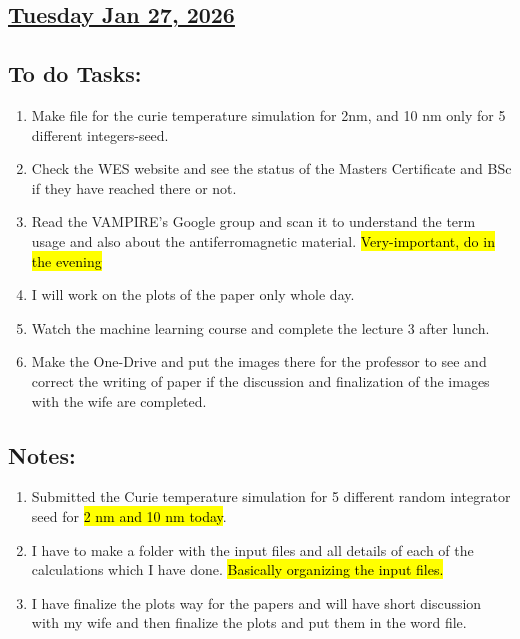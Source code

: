 \subsection*{\underline{Tuesday Jan 27, 2026}}
\subsection*{To do Tasks:}
\begin{enumerate}
     \item Make file for the curie temperature simulation for 2nm, and 10 nm only for 5 different integers-seed. \cmark
     \item Check the WES website and see the status of the Masters Certificate and BSc if they have reached there or not. \cmark
     \item Read the VAMPIRE's Google group and scan it to understand the  term usage and also about the antiferromagnetic material. \hl{Very-important, do in the evening}
     \item I will work on the plots of the paper only whole day. \cmark
     \item Watch the machine learning course and complete the lecture 3 after lunch. \xmark
     \item Make the One-Drive and put the images there for the professor to see and correct the writing of paper if the discussion and finalization of the images with the wife are completed. \xmark
\end{enumerate}
\subsection*{Notes:}
\begin{enumerate}
    \item Submitted the Curie temperature simulation for 5 different random integrator seed for \hl{2 nm and 10 nm today}.
    \item I have to make a folder with the input files and all details of each of the calculations which I have done. \hl{Basically organizing the input files.}
    \item I have finalize the plots way for the papers and will have short discussion with my wife and then finalize the plots and put them in the word file.
\end{enumerate}
